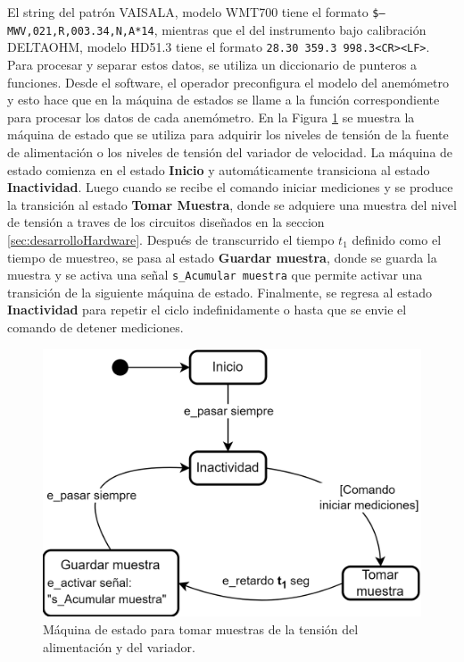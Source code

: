 El string del patrón VAISALA, modelo WMT700 tiene el formato \texttt{\$--MWV,021,R,003.34,N,A*14}, mientras que el del instrumento bajo calibración DELTAOHM, modelo HD51.3 tiene el formato \texttt{28.30 359.3 998.3<CR><LF>}. Para procesar y separar estos datos, se utiliza un diccionario de punteros a funciones. Desde el software, el operador preconfigura el modelo del anemómetro y esto hace que en la  máquina de estados se llame a la función correspondiente para procesar los datos de cada anemómetro. En la Figura \ref{fig:sc_sampleSensorVoltage} se muestra la máquina de estado que se utiliza para adquirir los niveles de tensión de la fuente de alimentación o los niveles de tensión del variador de velocidad. La máquina de estado comienza en el estado \textbf{Inicio} y automáticamente transiciona al estado \textbf{Inactividad}. Luego cuando se recibe el comando iniciar mediciones y se produce la transición al estado \textbf{Tomar Muestra}, donde se adquiere una muestra del nivel de tensión a traves de los circuitos diseñados en la seccion \ref{sec:desarrolloHardware}. Después de transcurrido el tiempo $t_{1}$ definido como el tiempo de muestreo, se pasa al estado \textbf{Guardar muestra}, donde se guarda la muestra  y se activa una señal \texttt{s\_Acumular muestra} que permite activar una transición de la siguiente máquina de estado. Finalmente, se regresa al estado \textbf{Inactividad} para repetir el ciclo indefinidamente o hasta que se envie el comando de detener mediciones.

\begin{figure}[H]
    \centering
    \includegraphics[width=0.6\linewidth]{Figuras/datalogger/Firmware/sc_sampleSensorVoltage.png}
    \caption{Máquina de estado para tomar muestras de la tensión del alimentación y del variador.}
    \label{fig:sc_sampleSensorVoltage}
\end{figure}

